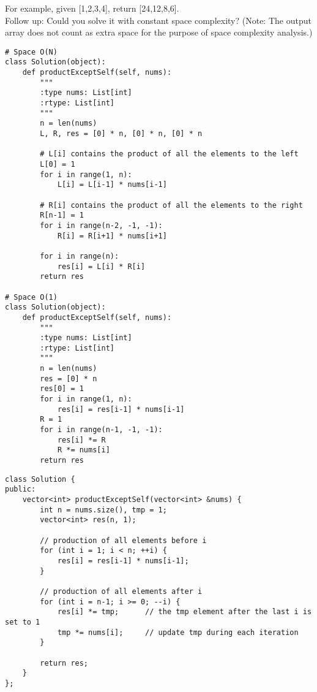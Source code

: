 For example, given [1,2,3,4], return [24,12,8,6].\\

Follow up: Could you solve it with constant space complexity? (Note: The output array does not count as extra space for the purpose of space complexity analysis.)\\

\begin{lstlisting}
# Space O(N) 
class Solution(object):
    def productExceptSelf(self, nums):
        """
        :type nums: List[int]
        :rtype: List[int]
        """
        n = len(nums)
        L, R, res = [0] * n, [0] * n, [0] * n
        
        # L[i] contains the product of all the elements to the left
        L[0] = 1
        for i in range(1, n):
            L[i] = L[i-1] * nums[i-1]
            
        # R[i] contains the product of all the elements to the right
        R[n-1] = 1
        for i in range(n-2, -1, -1):
            R[i] = R[i+1] * nums[i+1]
            
        for i in range(n):
            res[i] = L[i] * R[i]
        return res

# Space O(1)
class Solution(object):
    def productExceptSelf(self, nums):
        """
        :type nums: List[int]
        :rtype: List[int]
        """
        n = len(nums)
        res = [0] * n
        res[0] = 1
        for i in range(1, n):
            res[i] = res[i-1] * nums[i-1]
        R = 1
        for i in range(n-1, -1, -1):
            res[i] *= R
            R *= nums[i]
        return res
\end{lstlisting}

\begin{lstlisting}
class Solution {
public:
    vector<int> productExceptSelf(vector<int> &nums) {
        int n = nums.size(), tmp = 1;
        vector<int> res(n, 1);
        
        // production of all elements before i
        for (int i = 1; i < n; ++i) {
            res[i] = res[i-1] * nums[i-1];
        }
        
        // production of all elements after i
        for (int i = n-1; i >= 0; --i) {
            res[i] *= tmp;      // the tmp element after the last i is set to 1
            tmp *= nums[i];     // update tmp during each iteration
        }
        
        return res;
    }
};
\end{lstlisting}

